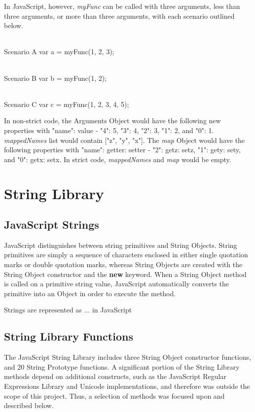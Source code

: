 \documentclass[a4paper,11pt,twoside]{report}
\begin{document}
In JavaScript, however, \textit{myFunc} can be called with three arguments, less than three arguments, or more than three arguments, with each scenario outlined below.
\begin{adjustwidth}{4cm}{4cm}
\begin{lstjs}
\\ Scenario A
var a = myFunc(1, 2, 3);

\\ Scenario B
var b = myFunc(1, 2);

\\ Scenario C
var c = myFunc(1, 2, 3, 4, 5);
\end{lstjs}
\end{adjustwidth}
In non-strict code, the Arguments Object would have the following new properties with "name": value - "4": 5, "3": 4, "2": 3, "1": 2, and "0": 1. \textit{mappedNames} list would contain ["z", "y", "x"]. The \textit{map} Object would have the following properties with "name": getter: setter - "2": getz: setz, "1": gety: sety, and "0": getx: setx. In strict code, \textit{mappedNames} and \textit{map} would be empty.

\chapter{String Library}
\section{JavaScript Strings}
JavaScript distinguishes between string primitives and String Objects. String primitives are simply a sequence of characters enclosed in either single quotation marks or double quotation marks, whereas String Objects are created with the String Object constructor and the \textbf{new} keyword. When a String Object method is called on a primitive string value, JavaScript automatically converts the primitive into an Object in order to execute the method.

Strings are represented as ... in JavaScript

\section{String Library Functions}\label{sec:stringmethods}
The JavaScript String Library includes three String Object constructor functions, and 20 String Prototype functions. A significant portion of the String Library methods depend on additional constructs, such as the JavaScript Regular Expressions Library and Unicode implementations, and therefore was outside the scope of this project. Thus, a selection of methods was focused upon and described below.
\end{document}
